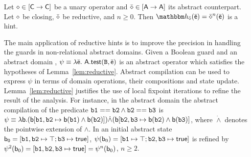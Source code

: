 \documentclass{llncs}
\begin{document}
\begin{lemma}
\label{lem:reductive}
Let $\diamond \in [\mathsf{C} \rightarrow\mathsf{C}]$ be a unary operator and $\bar{\mathsf{\mathsf{\diamond}}} \in [{\mathsf{A}} \rightarrow{\mathsf{A}}]$ its abstract counterpart.
Let $\diamond$ be closing,  $\bar{\mathsf{\mathsf{\diamond}}}$ be reductive, and $n \geq 0$.
Then $\hint{\ael{\op}}(\ael{e}) =\ael{\op}^{n}(\ael{e})$ is a hint.
\end{lemma}

The main application of reductive hints is to improve the precision in handling the guards in non-relational abstract domains.
Given a Boolean guard  and an abstract domain , $\psi \equiv \lambda{\ensuremath{\bar{\mathsf{\mathsf{e}}}}}.\ {\mathsf{A}}.\mathsf{\mathsf{test}}(\mathtt{B}, \bar{\mathsf{\mathsf{e}}})$ is an abstract operator which satisfies the hypotheses of Lemma~\ref{lem:reductive}.
Abstract compilation can be used to express $\psi$ in terms of domain operations, their compositions and state update.
Lemma~\ref{lem:reductive} justifies the use of local fixpoint iterations to refine the result of the analysis.
For instance, in the abstract domain  
the abstract compilation of the predicate  $ \mathtt{b1} == \mathtt{b2} \wedge \mathtt{b2} == \mathtt{b3}$ is
$\psi \equiv \lambda \mathsf{b}. (\mathsf{b}[\mathtt{b1},\mathtt{b2} \mapsto \mathsf{b}(\mathtt{b1}) \wedge \mathsf{b}(\mathtt{b2})]) \dot\wedge (\mathsf{b}[\mathtt{b2},\mathtt{b3} \mapsto \mathsf{b}(\mathtt{b2}) \wedge \mathsf{b}(\mathtt{b3})] $, where $\dot\wedge$ denotes the pointwise extension of $\wedge$. 
In an initial abstract state  $\mathsf{b_0} = [\mathtt{b1}, \mathtt{b2} \mapsto \top; \mathtt{b3} \mapsto \mathsf{true}]$,  
$\psi(\mathsf{b}_0) = [ \mathtt{b1} \mapsto \top; \mathtt{b2}, \mathtt{b3} \mapsto \mathsf{true}  ]$ is refined by  $\psi^2(\mathsf{b}_0) = [ \mathtt{b1}, \mathtt{b2}, \mathtt{b3} \mapsto \mathsf{true}] = \psi^n(\mathsf{b}_0)$, $n \geq 2$.
\end{document}
